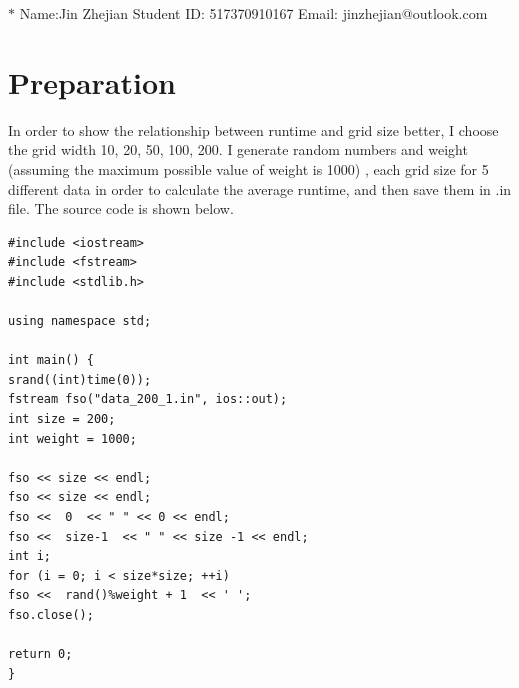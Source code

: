 \documentclass[12pt,a4paper]{article}
\theoremstyle{definition}
\begin{document}
\noindent

\noindent{}
\begin{center}
	\footnotesize{\color{blue}$*$ Name:Jin Zhejian	\quad Student ID: 517370910167 \quad Email: jinzhejian@outlook.com}
\end{center}




\section{Preparation}
 In order to show the relationship between runtime and grid size better, I choose the grid width 10, 20, 50, 100, 200.  I  generate random numbers and weight (assuming the maximum possible value of weight is 1000) , each grid size for 5 different data in order to calculate the average runtime, and then save them in  .in file. The source code is shown below.
 \begin{lstlisting}[caption={generate.cpp}]
#include <iostream>
#include <fstream>
#include <stdlib.h>

using namespace std;

int main() {
srand((int)time(0));
fstream fso("data_200_1.in", ios::out);
int size = 200;
int weight = 1000;

fso << size << endl;
fso << size << endl;
fso <<  0  << " " << 0 << endl;
fso <<  size-1  << " " << size -1 << endl;
int i;
for (i = 0; i < size*size; ++i)
fso <<  rand()%weight + 1  << ' ';
fso.close();

return 0;
}

 \end{lstlisting}
\end{document}
